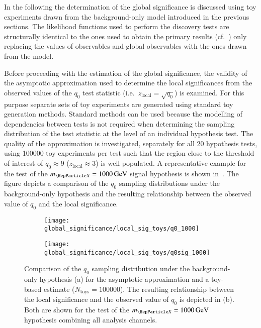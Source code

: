 In the following the determination of the global significance is discussed using
toy experiments drawn from the background-only model introduced in the previous
sections. The likelihood functions used to perform the discovery tests are
structurally identical to the ones used to obtain the primary results (cf.\
) only replacing the values of observables and
global observables with the ones drawn from the model.

Before proceeding with the estimation of the global significance, the validity
of the asymptotic approximation used to determine the local significances from
the observed values of the $q_0$ test statistic (i.e.\
$z_{\text{local}} = \sqrt{q_0}$) is examined. For this purpose separate sets of
toy experiments are generated using standard toy generation methods. Standard
methods can be used because the modelling of dependencies between tests is not
required when determining the sampling distribution of the test statistic at the
level of an individual hypothesis test. The quality of the approximation is
investigated, separately for all 20 hypothesis tests, using \num{100000} toy
experiments per test such that the region close to the threshold of interest of
$q_0 \approx 9$ ($z_{\text{local}} \approx 3$) is well populated. A
representative example for the test of the $\mX = \SI{1000}{\GeV}$ signal
hypothesis is shown in~\Cref{fig:q0_samplingdist}. The figure depicts a
comparison of the $q_0$ sampling distributions under the background-only
hypothesis and the resulting relationship between the observed value of $q_0$
and the local significance.

\begin{figure}[htbp]
  \centering

  \begin{subfigure}{0.485\textwidth}
    \centering

    \texttt{[image: global\_significance/local\_sig\_toys/q0\_1000]}
    \subcaption{}
  \end{subfigure}\hfill%
  \begin{subfigure}{0.485\textwidth}
    \centering
    \texttt{[image: global\_significance/local\_sig\_toys/q0sig\_1000]}
    \subcaption{}%
    \label{fig:q0_samplingdist_q0sig}
  \end{subfigure}

  \caption{Comparison of the $q_0$ sampling distribution under the
    background-only hypothesis (a) for the asymptotic approximation and a
    toy-based estimate ($N_{\text{toys}} = \num{100000}$). The resulting
    relationship between the local significance and the observed value of $q_0$
    is depicted in (b). Both are shown for the test of the
    $\mX = \SI{1000}{\GeV}$ hypothesis combining all analysis channels.}%
  \label{fig:q0_samplingdist}
\end{figure}


